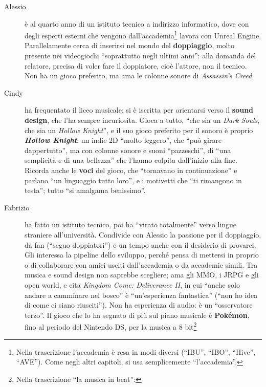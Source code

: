 \begin{description}
  \item[Alessio] è al quarto anno di un istituto tecnico a indirizzo
        informatico, dove con degli esperti esterni che vengono
        dall'accademia\footnote{Nella trascrizione l'accademia è resa in modi
        diversi (``IBU'', ``IBO'', ``Hive'', ``AVE''). Come negli altri
        capitoli, si usa semplicemente ``l'accademia''.} lavora con Unreal
        Engine. Parallelamente cerca di inserirsi nel mondo del
        \textbf{doppiaggio}, molto presente nei videogiochi ``soprattutto negli
        ultimi anni'': alla domanda del relatore, precisa di voler fare il
        doppiatore, cioè l'attore, non il tecnico. Non ha un gioco preferito,
        ma ama le colonne sonore di \emph{Assassin's Creed}.
  \item[Cindy] ha frequentato il liceo musicale; si è iscritta per orientarsi
        verso il \textbf{sound design}, che l'ha sempre incuriosita. Gioca a
        tutto, ``che sia un \emph{Dark Souls}, che sia un \emph{Hollow
        Knight}'', e il suo gioco preferito per il sonoro è proprio
        \textbf{\emph{Hollow Knight}}: un indie 2D ``molto leggero'', che ``può
        girare dappertutto'', ma con colonne sonore e suoni ``pazzeschi'', di
        ``una semplicità e di una bellezza'' che l'hanno colpita dall'inizio
        alla fine. Ricorda anche le \textbf{voci} del gioco, che ``tornavano in
        continuazione'' e parlano ``un linguaggio tutto loro'', e i motivetti
        che ``ti rimangono in testa''; tutto ``si amalgama benissimo''.
  \item[Fabrizio] ha fatto un istituto tecnico, poi ha ``virato totalmente''
        verso lingue straniere all'università. Condivide con Alessio la
        passione per il doppiaggio, da fan (``seguo doppiatori'') e un tempo
        anche con il desiderio di provarci. Gli interessa la pipeline dello
        sviluppo, perché pensa di mettersi in proprio o di collaborare con amici
        usciti dall'accademia o da accademie simili. Tra musica e sound design
        non saprebbe scegliere; ama gli MMO, i JRPG e gli open world, e cita
        \emph{Kingdom Come: Deliverance II}, in cui ``anche solo andare a
        camminare nel bosco'' è ``un'esperienza fantastica'' (``non ho idea di
        come ci siano riusciti''). Non ha esperienza di audio: è un
        ``osservatore terzo''. Il gioco che lo ha segnato di più sul piano
        musicale è \textbf{Pokémon}, fino al periodo del Nintendo DS, per la
        musica a 8 bit\footnote{Nella trascrizione ``la musica in beat'':
}
\end{description}
